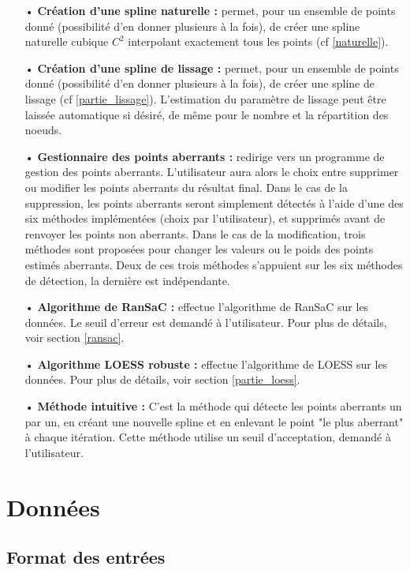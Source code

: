\documentclass[a4paper,12pt]{article} %
\begin{document}
\begin{itemize}
    \item[•] \textbf{Création d'une spline naturelle :} permet, pour un ensemble de points donné (possibilité d'en donner plusieurs à la fois), de créer une spline naturelle cubique $C^2$ interpolant exactement tous les points (cf \ref{naturelle}).
    \item[•] \textbf{Création d'une spline de lissage :} permet, pour un ensemble de points donné (possibilité d'en donner plusieurs à la fois), de créer une spline de lissage (cf \ref{partie_lissage}). L'estimation du paramètre de lissage peut être laissée automatique si désiré, de même pour le nombre et la répartition des noeuds.
    \item[•] \textbf{Gestionnaire des points aberrants :} redirige vers un programme de gestion des points aberrants. L'utilisateur aura alors le choix entre supprimer ou modifier les points aberrants du résultat final. Dans le cas de la suppression, les points aberrants seront simplement détectés à l'aide d'une des six méthodes implémentées (choix par l'utilisateur), et supprimés avant de renvoyer les points non aberrants. Dans le cas de la modification, trois méthodes sont proposées pour changer les valeurs ou le poids des points estimés aberrants. Deux de ces trois méthodes s'appuient sur les six méthodes de détection, la dernière est indépendante.
    \item[•] \textbf{Algorithme de RanSaC :} effectue l'algorithme de RanSaC sur les données. Le seuil d'erreur est demandé à l'utilisateur. Pour plus de détails, voir section \ref{ransac}.
    \item[•] \textbf{Algorithme LOESS robuste :} effectue l'algorithme de LOESS sur les données. Pour plus de détails, voir section \ref{partie_loess}.
    \item[•] \textbf{Méthode intuitive :} C'est la méthode qui détecte les points aberrants un par un, en créant une nouvelle spline et en enlevant le point "le plus aberrant" à chaque itération. Cette méthode utilise un seuil d'acceptation, demandé à l'utilisateur.
\end{itemize}

\section{Données}

\subsection{Format des entrées}
\end{document}
